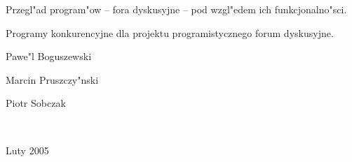 \documentclass[12pt,a4paper,twoside]{article}
\begin{document}

\begin{center}
\Huge{Przegl"ad program"ow -- fora dyskusyjne -- pod wzgl"edem ich funkcjonalno"sci.}
\newline
\newline
\newline
\newline
\end{center}

\begin{center}
\Large{Programy konkurencyjne dla projektu programistycznego forum dyskusyjne.}
\newline
\newline
\newline
\newline
\newline
\newline
\end{center}


\begin{center}
Pawe"l Boguszewski
\end{center}
\begin{center}
Marcin Pruszczy"nski
\end{center}
\begin{center}
Piotr Sobczak
\end{center}
\begin{center}
~
\newline
\newline
\newline
\newline
\newline
\newline
\end{center}


\begin{center}
Luty 2005
\end{center}

\newpage
\end{document}
